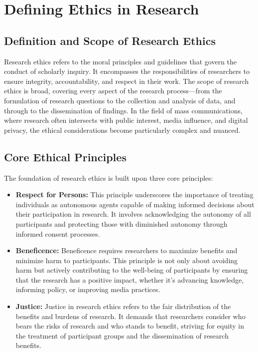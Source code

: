 \documentclass[
]{book}
\begin{document}
\hypertarget{defining-ethics-in-research}{%
\section{Defining Ethics in Research}\label{defining-ethics-in-research}}

\hypertarget{definition-and-scope-of-research-ethics}{%
\subsection*{Definition and Scope of Research Ethics}\label{definition-and-scope-of-research-ethics}}

Research ethics refers to the moral principles and guidelines that govern the conduct of scholarly inquiry. It encompasses the responsibilities of researchers to ensure integrity, accountability, and respect in their work. The scope of research ethics is broad, covering every aspect of the research process---from the formulation of research questions to the collection and analysis of data, and through to the dissemination of findings. In the field of mass communications, where research often intersects with public interest, media influence, and digital privacy, the ethical considerations become particularly complex and nuanced.

\hypertarget{core-ethical-principles}{%
\subsection*{Core Ethical Principles}\label{core-ethical-principles}}

The foundation of research ethics is built upon three core principles:

\begin{itemize}
\item
  \textbf{Respect for Persons:} This principle underscores the importance of treating individuals as autonomous agents capable of making informed decisions about their participation in research. It involves acknowledging the autonomy of all participants and protecting those with diminished autonomy through informed consent processes.
\item
  \textbf{Beneficence:} Beneficence requires researchers to maximize benefits and minimize harm to participants. This principle is not only about avoiding harm but actively contributing to the well-being of participants by ensuring that the research has a positive impact, whether it's advancing knowledge, informing policy, or improving media practices.
\item
  \textbf{Justice:} Justice in research ethics refers to the fair distribution of the benefits and burdens of research. It demands that researchers consider who bears the risks of research and who stands to benefit, striving for equity in the treatment of participant groups and the dissemination of research benefits.
\end{itemize}
\end{document}
